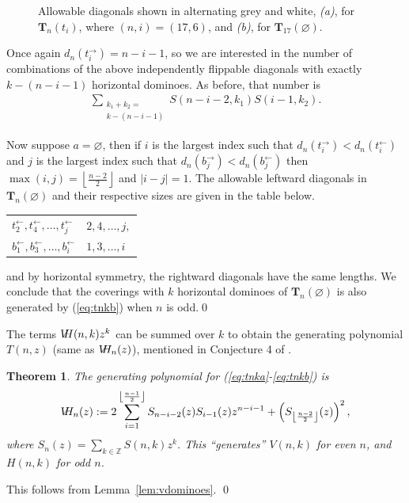 \documentclass[12pt]{amsart}
\newtheorem{theorem}{Theorem}
\newcommand{\lref}[1]{Lemma~\ref{lem:#1}}
\newcommand\flr[2]{\left\lfloor \frac{#1}{#2} \right\rfloor}
\newcommand\tright[1]{t_{#1}^\rightarrow}
\newcommand\tleft[1]{t_{#1}^\leftarrow}
\newcommand\bright[1]{b_{#1}^\rightarrow}
\newcommand\bleft[1]{b_{#1}^\leftarrow}
\newcommand\ssum[1]{\sum_{ \substack{#1}}}
\newcommand{\Tn}[1]{\mathbf T_{#1}}
\newcommand{\vh}{V\hspace{-5pt}H}
\begin{document}
\begin{figure}[h]
  \centering
  \subfigure[]{%
    \label{fig:oddExample}} %
  \hspace{0.3in}%
  \subfigure[]{%
    \label{fig:oddEmptySet}}%
%  
  \caption{Allowable diagonals shown in alternating grey and white,
    \emph{(a)}, for $\Tn{n}(t_i)$, where $(n,i)=(17,6)$, and
    \emph{(b)}, for $\Tn{17}(\varnothing)$.}
\label{fig:oddTn}
\end{figure}

Once again $d_n(\tright{i})=n-i-1$, so we are interested in the number
of combinations of the above independently flippable diagonals with
exactly $k-(n-i-1)$ horizontal dominoes.  As before, that number is
\begin{align*}
  \ssum{k_1+k_2 = \\k -(n-i-1)} S(n-i-2,k_1)S(i-1,k_2).
\end{align*}


Now suppose $a=\varnothing$, then if $i$ is the largest index such
that $d_n(\tright{i}) < d_n(\tleft{i})$ and $j$ is the largest index
such that $d_n(\bright{j}) < d_n(\bleft{j})$ then $\max(i,j) =
\flr{n-2}{2}$ and $|i-j|=1$. The allowable leftward diagonals in
$\Tn{n}(\varnothing)$ and their respective sizes are given in the
table below.
 \begin{center}
\begin{tabular}{ll}
  \centering
  $    \tleft{2}, \tleft{4}, \ldots,\tleft{j}$&$  2, 4, \ldots,j,$\\
  $    \bleft{1},\bleft{3}, \ldots, \bleft{i} $&$  1,3, \ldots, i$\\
\end{tabular}
\end{center}
and by horizontal symmetry, the rightward diagonals have the same
lengths.  We conclude that the coverings with $k$ horizontal dominoes of
$\Tn{n}(\varnothing)$ is also generated by (\ref{eq:tnkb}) when $n$ is
odd.\qed

The terms $\vh(n,k)z^k$ can be summed over $k$ to obtain the
generating polynomial $T(n,z)$ (same as $\vh_n(z)$), mentioned in
Conjecture 4 of \cite{EricksonRuskeySchurch2011}.

\begin{theorem}
  \label{thm:vdominoes}
  The generating polynomial for (\ref{eq:tnka}-\ref{eq:tnkb}) is
  \begin{align}
    \label{eq:tnz}
    \vh_n(z):=2\sum_{i=1}^{\flr{n-1}{2}}
    S_{n-i-2}(z)S_{i-1}(z)z^{n-i-1} +
    \left(S_{\flr{n-2}{2}}(z)\right)^2,
  \end{align}
  where $S_n(z) = \sum_{k\in \mathbb Z} S(n,k)z^k$.  This
  ``generates'' $V(n,k)$ for even $n$, and $H(n,k)$ for odd $n$.
\end{theorem}
\proof This follows from \lref{vdominoes}.  \qed
\end{document}
